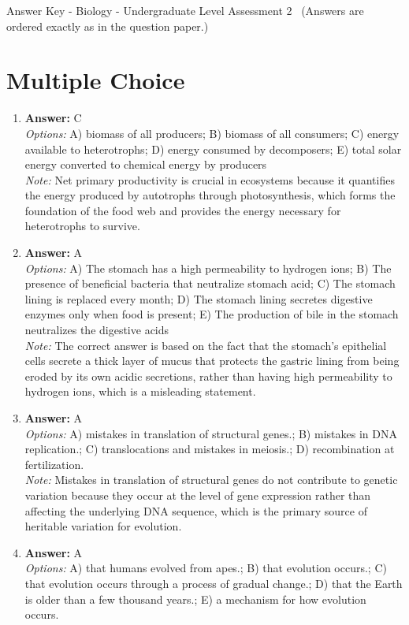 \documentclass[12pt]{article}
\begin{document}
\begin{center}
Answer Key - Biology - Undergraduate Level Assessment 2 \
\small (Answers are ordered exactly as in the question paper.)
\end{center}

\section*{Multiple Choice}
\begin{enumerate}[label=\arabic*.]
\item \textbf{Answer:} C
\\ \textit{Options:} A) biomass of all producers; B) biomass of all consumers; C) energy available to heterotrophs; D) energy consumed by decomposers; E) total solar energy converted to chemical energy by producers
\\ \textit{Note:} Net primary productivity is crucial in ecosystems because it quantifies the energy produced by autotrophs through photosynthesis, which forms the foundation of the food web and provides the energy necessary for heterotrophs to survive.
\item \textbf{Answer:} A
\\ \textit{Options:} A) The stomach has a high permeability to hydrogen ions; B) The presence of beneficial bacteria that neutralize stomach acid; C) The stomach lining is replaced every month; D) The stomach lining secretes digestive enzymes only when food is present; E) The production of bile in the stomach neutralizes the digestive acids
\\ \textit{Note:} The correct answer is based on the fact that the stomach's epithelial cells secrete a thick layer of mucus that protects the gastric lining from being eroded by its own acidic secretions, rather than having high permeability to hydrogen ions, which is a misleading statement.
\item \textbf{Answer:} A
\\ \textit{Options:} A) mistakes in translation of structural genes.; B) mistakes in DNA replication.; C) translocations and mistakes in meiosis.; D) recombination at fertilization.
\\ \textit{Note:} Mistakes in translation of structural genes do not contribute to genetic variation because they occur at the level of gene expression rather than affecting the underlying DNA sequence, which is the primary source of heritable variation for evolution.
\item \textbf{Answer:} A
\\ \textit{Options:} A) that humans evolved from apes.; B) that evolution occurs.; C) that evolution occurs through a process of gradual change.; D) that the Earth is older than a few thousand years.; E) a mechanism for how evolution occurs.

\end{enumerate}
\end{document}
